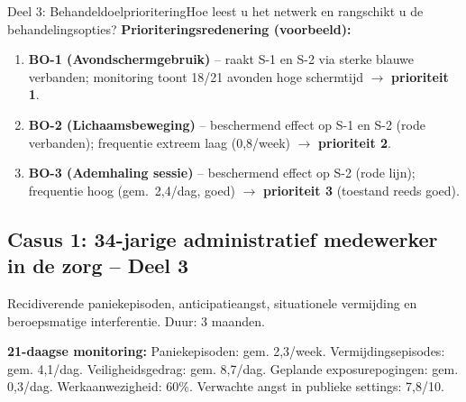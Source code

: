 \documentclass[11pt,a4paper]{article}
\begin{document}
\begin{voorbeeldbox}{Deel 3: Behandeldoelprioritering}{Hoe leest u het netwerk en rangschikt u de behandelingsopties?}
\medskip
\textbf{Prioriteringsredenering (voorbeeld):}
\begin{enumerate}[topsep=2pt,itemsep=1pt,label=\arabic*.]
\item \textbf{BO-1 (Avondschermgebruik)} -- raakt S-1 en S-2 via sterke blauwe verbanden;
monitoring toont 18/21 avonden hoge schermtijd $\rightarrow$ \textbf{prioriteit 1}.
\item \textbf{BO-2 (Lichaamsbeweging)} -- beschermend effect op S-1 en S-2 (rode verbanden);
frequentie extreem laag (0,8/week) $\rightarrow$ \textbf{prioriteit 2}.
\item \textbf{BO-3 (Ademhaling sessie)} -- beschermend effect op S-2 (rode lijn);
frequentie hoog (gem.\ 2,4/dag, goed) $\rightarrow$ \textbf{prioriteit 3} (toestand reeds goed).
\end{enumerate}
\end{voorbeeldbox}

\vspace{0.5em}

\newpage
\subsection*{Casus 1: 34-jarige administratief medewerker in de zorg -- Deel 3}

\begin{complaintbox}[title={Casus 1: 34-jarige administratief medewerker in de zorg}]
\small Recidiverende paniekepisoden, anticipatieangst, situationele vermijding en beroepsmatige interferentie. Duur: 3 maanden.
\end{complaintbox}

\begin{monitorbox}
\small\textbf{21-daagse monitoring:} Paniekepisoden: gem. 2,3/week. Vermijdingsepisodes: gem. 4,1/dag. Veiligheidsgedrag: gem. 8,7/dag. Geplande exposurepogingen: gem. 0,3/dag. Werkaanwezigheid: 60\%. Verwachte angst in publieke settings: 7,8/10.
\end{monitorbox}
\end{document}

